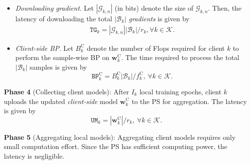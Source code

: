\documentclass[10pt,journal,transmag]{IEEEtran}
\begin{document}
\begin{itemize}
    \item[(5)] \textit{Downloading gradient}. Let $|\mathcal{G}_{k,n}|$ (in bits) denote the size of $\mathcal{G}_{k,n}$. Then, the latency of downloading the total $|\mathcal{B}_k|$ \textit{gradients} is given by
    \begin{align}
        \texttt{TG}_k = |\mathcal{G}_{k,n}| |\mathcal{B}_k| / {r_k} , \forall k \in \mathcal{K}.
    \end{align}   

    \item[(6)] \textit{Client-side BP}. Let $B^\text{C}_k$ denote the number of Flops required for client $k$ to perform the sample-wise BP on $\textbf{w}^\text{C}_k$. 
    The time required to process the total $|\mathcal{B}_k|$ samples is given by
    \begin{equation}
        \texttt{BP}_k^\text{C} = B^\text{C}_k  |\mathcal{B}_k| / f_k^\text{C},\ \forall k \in \mathcal{K}.
    \end{equation}
\end{itemize}

\textbf{Phase 4} (Collecting client models): After $I_k$ local training epochs, client $k$ uploads the updated \textit{client-side} model $\textbf{w}^\text{C}_k$ to the PS for aggregation. The latency is given by 
\begin{equation}
   \texttt{UM}_k =  |\textbf{w}^\text{C}_k| / r_k ,\ \forall k \in \mathcal{K}. \label{tau_sfl_k_upload_model}
\end{equation}

\textbf{Phase 5} (Aggregating local models):
Aggregating client models requires only small computation effort. Since the PS has sufficient computing power, the latency is negligible.
\end{document}
